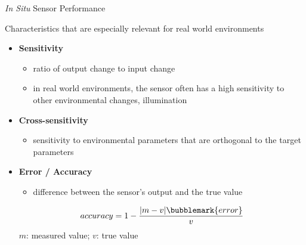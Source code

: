 \documentclass[compress]{beamer}
\begin{document}
\begin{frame}{\emph{In Situ} Sensor Performance}

    Characteristics that are especially relevant for real
    world environments

    \begin{itemize}
        \item {\bf Sensitivity}

            \begin{itemize}
                    
                \item
                    ratio of output change to input change
                \item
                    in real world environments, the sensor often has a high sensitivity to
                    other environmental changes, \eg illumination
            \end{itemize}

        \item {\bf Cross-sensitivity}

            \begin{itemize}
                    
                \item
                    sensitivity to environmental parameters that are orthogonal to the
                    target parameters
            \end{itemize}

        \item {\bf Error / Accuracy}

            \begin{itemize}
                    
                \item
                    difference between the sensor's output and the true value
            \end{itemize}
            \[
                accuracy =  1 - \frac{|m-v|\bubblemark{error}}{v}
            \]
            $m$: measured value; $v$: true value
    \end{itemize}
\end{frame}
\end{document}
